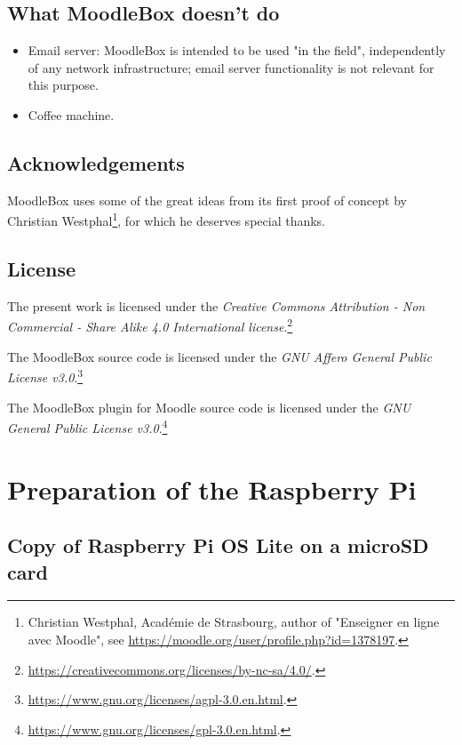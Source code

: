 \documentclass[12pt]{article}
\begin{document}
\subsection{What MoodleBox doesn't do}

\begin{itemize}
\item Email server: MoodleBox is intended to be used "in the field", independently of any network infrastructure; email server functionality is not relevant for this purpose.
\item Coffee machine.
\end{itemize}

\subsection{Acknowledgements}

MoodleBox uses some of the great ideas from its first proof of concept by Christian Westphal\footnote{Christian Westphal, Académie de Strasbourg, author of "Enseigner en ligne avec Moodle", see \url{https://moodle.org/user/profile.php?id=1378197}.}, for which he deserves special thanks.

\subsection{License}

The present work is licensed under the \textsl{Creative Commons Attribution - Non Commercial - Share Alike  4.0 International license}.\footnote{\url{https://creativecommons.org/licenses/by-nc-sa/4.0/}.}


The MoodleBox source code is licensed under the \textsl{GNU Affero General Public License v3.0}.\footnote{\url{https://www.gnu.org/licenses/agpl-3.0.en.html}.}


The MoodleBox plugin for Moodle source code is licensed under the \textsl{GNU General Public License v3.0}.\footnote{\url{https://www.gnu.org/licenses/gpl-3.0.en.html}.}


\section{Preparation of the Raspberry Pi}

\subsection{Copy of Raspberry Pi OS Lite on a microSD card}
\end{document}
